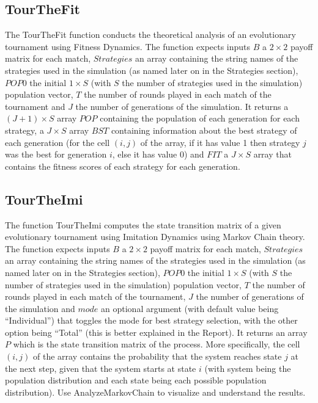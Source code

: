 \subsection{TourTheFit}
The TourTheFit function conducts the theoretical analysis of an evolutionary tournament using Fitness Dynamics. The function expects inputs $B$ a $2 \times 2$ payoff matrix for each match, $Strategies$ an array containing the string names of the strategies used in the simulation (as named later on in the Strategies section), $POP0$ the initial $1 \times S$ (with $S$ the number of strategies used in the simulation) population vector, $T$ the number of rounds played in each match of the tournament and $J$ the number of generations of the simulation. It returns a $(J+1) \times S$ array $POP$ containing the population of each generation for each strategy, a $J \times S$ array $BST$ containing information about the best strategy of each generation (for the cell $(i,j)$ of the array, if it has value 1 then strategy $j$ was the best for generation $i$, else it has value 0) and $FIT$ a $J \times S$ array that contains the fitness scores of each strategy for each generation.

\subsection{TourTheImi}
The function TourTheImi computes the state transition matrix of a given evolutionary tournament using Imitation Dynamics using Markov Chain theory. The function expects inputs $B$ a $2 \times 2$ payoff matrix for each match, $Strategies$ an array containing the string names of the strategies used in the simulation (as named later on in the Strategies section), $POP0$ the initial $1 \times S$ (with $S$ the number of strategies used in the simulation) population vector, $T$ the number of rounds played in each match of the tournament, $J$ the number of generations of the simulation and $mode$ an optional argument (with default value being ``Individual'') that toggles the mode for best strategy selection, with the other option being ``Total'' (this is better explained in the Report). It returns an array $P$ which is the state transition matrix of the process. More specifically, the cell $(i,j)$ of the array contains the probability that the system reaches state $j$ at the next step, given that the system starts at state $i$ (with system being the population distribution and each state being each possible population distribution). Use AnalyzeMarkovChain to visualize and understand the results.

